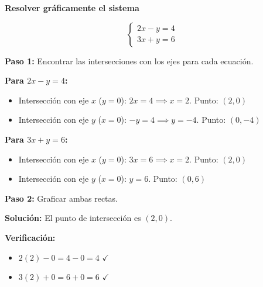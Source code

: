 \begin{example}
\textbf{Resolver gráficamente el sistema}

$$\begin{cases}
2x - y = 4 \\
3x + y = 6
\end{cases}$$

\textbf{Paso 1:} Encontrar las intersecciones con los ejes para cada ecuación.

\textbf{Para $2x - y = 4$:}
\begin{itemize}
    \item Intersección con eje $x$ ($y = 0$): $2x = 4 \implies x = 2$. Punto: $(2, 0)$
    \item Intersección con eje $y$ ($x = 0$): $-y = 4 \implies y = -4$. Punto: $(0, -4)$
\end{itemize}

\textbf{Para $3x + y = 6$:}
\begin{itemize}
    \item Intersección con eje $x$ ($y = 0$): $3x = 6 \implies x = 2$. Punto: $(2, 0)$
    \item Intersección con eje $y$ ($x = 0$): $y = 6$. Punto: $(0, 6)$
\end{itemize}

\textbf{Paso 2:} Graficar ambas rectas.

\begin{center}
\end{center}

\textbf{Solución:} El punto de intersección es $(2, 0)$.

\textbf{Verificación:}
\begin{itemize}
    \item $2(2) - 0 = 4 - 0 = 4$ \quad $\checkmark$
    \item $3(2) + 0 = 6 + 0 = 6$ \quad $\checkmark$
\end{itemize}
\end{example}

